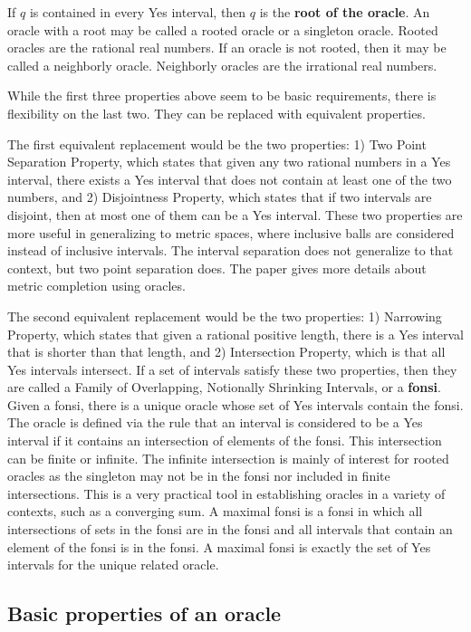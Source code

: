\documentclass[12pt]{article}
\theoremstyle{remark}
\begin{document}
If $q$ is contained in every Yes interval, then $q$ is the \textbf{root of the oracle}.  An oracle with a root may be called a rooted oracle or a singleton oracle. Rooted oracles are the rational real numbers. If an oracle is not rooted, then it may be called a neighborly oracle. Neighborly oracles are the irrational real numbers. 

While the first three properties above seem to be basic requirements, there is flexibility on the last two. They can be replaced with equivalent properties.

The first equivalent replacement would be the two properties: 1) Two Point Separation Property, which states that given any two rational numbers in a Yes interval, there exists a Yes interval that does not contain at least one of the two numbers, and 2) Disjointness Property, which states that if two intervals are disjoint, then at most one of them can be a Yes interval. These two properties are more useful in generalizing to metric spaces, where inclusive balls are considered instead of inclusive intervals. The interval separation does not generalize to that context, but two point separation does. The paper \cite{taylor23metric} gives more details about metric completion using oracles. 

The second equivalent replacement would be the two properties: 1) Narrowing Property, which states that given a rational positive length, there is a Yes interval that is shorter than that length, and 2) Intersection Property, which is that all Yes intervals intersect. If a set of intervals satisfy these two properties, then they are called a Family of Overlapping, Notionally Shrinking Intervals, or a \textbf{fonsi}. Given a fonsi, there is a unique oracle whose set of Yes intervals contain the fonsi. The oracle is defined via the rule that an interval is considered to be a Yes interval if it contains an intersection of elements of the fonsi. This intersection can be finite or infinite. The infinite intersection is mainly of interest for rooted oracles as the singleton may not be in the fonsi nor included in finite intersections. This is a very practical tool in establishing oracles in a variety of contexts, such as a converging sum. A maximal fonsi is a fonsi in which all intersections of sets in the fonsi are in the fonsi and all intervals that contain an element of the fonsi is in the fonsi. A maximal fonsi is exactly the set of Yes intervals for the unique related oracle. 


\subsection{Basic properties of an oracle}
\end{document}

